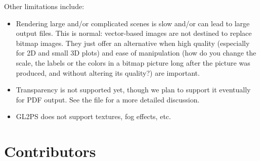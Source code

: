 \documentclass[10pt]{article}
\newcommand{\dd}{\begingroup\Url}
\begin{document}
Other limitations include:
\begin{itemize}
\item 
Rendering large and/or complicated scenes is slow and/or can lead to large
output files. This is normal: vector-based images are not destined to
replace bitmap images. They just offer an alternative when high quality
(especially for 2D and small 3D plots) and ease of manipulation (how do you
change the scale, the labels or the colors in a bitmap picture long after
the picture was produced, and without altering its quality?) are important.
\item
Transparency is not supported yet, though we plan to support it eventually
for PDF output. See the \dd{TODO} file for a more detailed discussion.
\item
GL2PS does not support textures, fog effects, etc.
\end{itemize}

%
%
%
% 
%
%
%

\section{Contributors}
\label{sec:contrib}
\end{document}

